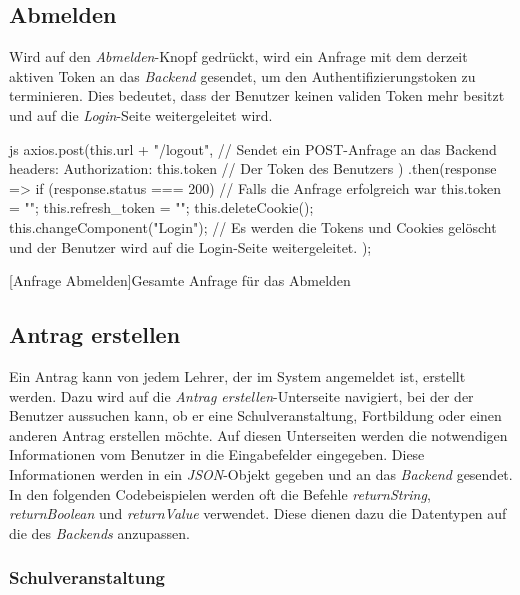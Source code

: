 \subsection{Abmelden}
Wird auf den \textit{Abmelden}-Knopf gedrückt, wird ein Anfrage mit dem derzeit aktiven Token an das \textit{Backend} gesendet, um den Authentifizierungstoken zu terminieren. Dies bedeutet, dass der Benutzer keinen validen Token mehr besitzt und auf die \textit{Login}-Seite weitergeleitet wird.
\begin{code}{js}
axios.post(this.url + "/logout", {	// Sendet ein POST-Anfrage an das Backend
	headers: { Authorization: this.token }	// Der Token des Benutzers
})
.then(response => {
	if (response.status === 200) {	// Falls die Anfrage erfolgreich war
		this.token = "";
		this.refresh_token = "";
		this.deleteCookie();
		this.changeComponent("Login");	// Es werden die Tokens und Cookies gelöscht und der Benutzer wird auf die Login-Seite weitergeleitet.
	}
});
\end{code}
[Anfrage Abmelden]{Gesamte Anfrage für das Abmelden}~\\
\newpage
\subsection{Antrag erstellen}
Ein Antrag kann von jedem Lehrer, der im System angemeldet ist, erstellt werden. Dazu wird auf die \textit{Antrag erstellen}-Unterseite navigiert, bei der der Benutzer aussuchen kann, ob er eine Schulveranstaltung, Fortbildung oder einen anderen Antrag erstellen möchte. Auf diesen Unterseiten werden die notwendigen Informationen vom Benutzer in die Eingabefelder eingegeben. Diese Informationen werden in ein \textit{JSON}-Objekt gegeben und an das \textit{Backend} gesendet.
\\
In den folgenden Codebeispielen werden oft die Befehle \textit{returnString}, \textit{returnBoolean} und \textit{returnValue} verwendet. Diese dienen dazu die Datentypen auf die des \textit{Backends} anzupassen. 
\subsubsection{Schulveranstaltung}
